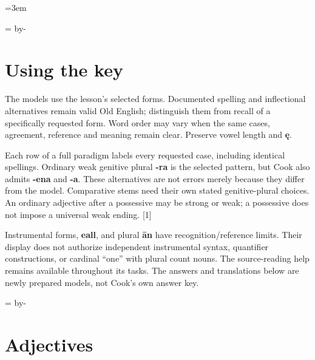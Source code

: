 \BookRecto
\begingroup
\renewcommand{\runningtitle}{Unit 3. Answer key}
\emergencystretch=3em
\newcommand{\itempara}[2]{\par\addvspace{3pt}\noindent\hangindent=1.8em\hangafter=1\makebox[1.8em][l]{#1.}#2\par}
\newcommand{\reserve}[1]{\par\begingroup\dimen0=\pagegoal\advance\dimen0 by-\pagetotal\ifdim\dimen0<#1\newpage\fi\endgroup}

\raggedright
{}

\reserve{7\baselineskip}
\section*{Using the key}

The models use the lesson’s selected forms. Documented spelling and inflectional alternatives remain valid Old English; distinguish them from recall of a specifically requested form. Word order may vary when the same cases, agreement, reference and meaning remain clear. Preserve vowel length and \textbf{ę}.

Each row of a full paradigm labels every requested case, including identical spellings. Ordinary weak genitive plural \textbf{-ra} is the selected pattern, but Cook also admits \textbf{-ena} and \textbf{-a}. These alternatives are not errors merely because they differ from the model. Comparative stems need their own stated genitive-plural choices. An ordinary adjective after a possessive may be strong or weak; a possessive does not impose a universal weak ending. [1]

Instrumental forms, \textbf{eall}, and plural \textbf{ān} have recognition/\allowbreak{}reference limits. Their display does not authorize independent instrumental syntax, quantifier constructions, or cardinal “one” with plural count nouns. The source-reading help remains available throughout its tasks. The answers and translations below are newly prepared models, not Cook’s own answer key.

\reserve{7\baselineskip}
\section*{Adjectives}

